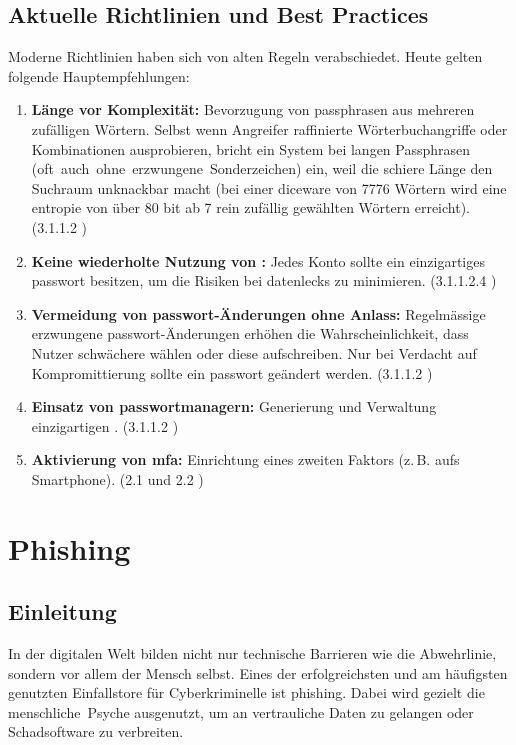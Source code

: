 \documentclass[12pt,a4paper]{article}
\begin{document}
\subsection{Aktuelle Richtlinien und Best Practices}
Moderne Richtlinien haben sich von alten Regeln verabschiedet. Heute gelten folgende Hauptempfehlungen:
\begin{enumerate}
    \item \textbf{Länge vor Komplexität:} Bevorzugung von \gls{passphrase}n aus mehreren \mbox{zufälligen} Wörtern. Selbst wenn Angreifer raffinierte Wörterbuchangriffe oder Kombinationen ausprobieren, bricht ein System bei langen Passphrasen \mbox{(oft auch ohne erzwungene Sonderzeichen)} ein, weil die schiere Länge den Suchraum unknackbar macht (bei einer \gls{diceware} von 7776 Wörtern wird eine \\ \gls{entropie} von über 80 \gls{bit} ab 7 rein zufällig gewählten Wörtern erreicht). (3.1.1.2 \cite{nist2025})
    \item \textbf{Keine wiederholte Nutzung von :} Jedes Konto sollte ein \mbox{einzigartiges} \gls{passwort} besitzen, um die Risiken bei \gls{datenleck}s zu minimieren. (3.1.1.2.4 \cite{nist2025})
    \item \textbf{Vermeidung von \gls{passwort}-Änderungen ohne Anlass:} Regelmässige \mbox{erzwungene} \gls{passwort}-Änderungen erhöhen die Wahrscheinlichkeit, dass Nutzer schwächere  wählen oder diese aufschreiben. Nur bei Verdacht auf Kompromittierung sollte ein \gls{passwort} geändert werden. (3.1.1.2 \cite{nist2025})
    \item \textbf{Einsatz von \gls{passwortmanager}n:} Generierung und Verwaltung einzigartigen \mbox{}. (3.1.1.2 \cite{nist2025})
    \item \textbf{Aktivierung von \gls{mfa}:} Einrichtung eines zweiten Faktors (z.\,B. aufs \mbox{Smartphone}). (2.1 und 2.2 \cite{nist2025})
\end{enumerate}

\newpage
\section{Phishing}
\label{sec:phishing}

\subsection{Einleitung}
In der digitalen Welt bilden nicht nur technische Barrieren wie  die \mbox{Abwehrlinie}, sondern vor allem der Mensch selbst. Eines der erfolgreichsten und am \mbox{häufigsten} genutzten Einfallstore für Cyberkriminelle ist \gls{phishing}. Dabei wird gezielt die \mbox{menschliche Psyche} ausgenutzt, um an vertrauliche Daten zu gelangen oder \mbox{Schadsoftware} zu verbreiten.
\end{document}
